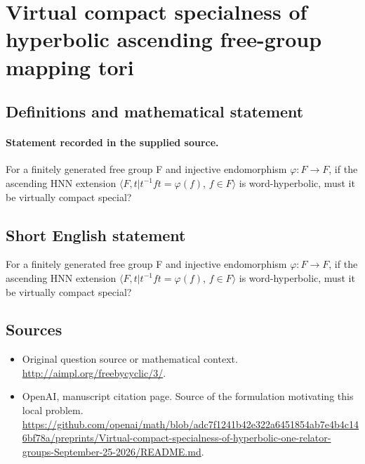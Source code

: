 \documentclass[11pt]{article}
\begin{document}
\section*{Virtual compact specialness of hyperbolic ascending free-group mapping tori}\label{30007193}
\subsection{Definitions and mathematical statement}
\paragraph{Statement recorded in the supplied source.}
For a finitely generated free group F and injective endomorphism $\varphi :F\to F$, if the ascending HNN extension $\langle F,t|t^{-1}ft=\varphi (f)$, $f\in F\rangle $ is word-hyperbolic, must it be virtually compact special?
\subsection{Short English statement}
For a finitely generated free group F and injective endomorphism $\varphi :F\to F$, if the ascending HNN extension $\langle F,t|t^{-1}ft=\varphi (f)$, $f\in F\rangle $ is word-hyperbolic, must it be virtually compact special?
\subsection{Sources}
\begin{itemize}
\item[S1] Original question source or mathematical context.
\url{http://aimpl.org/freebycyclic/3/}.
\item[S2] OpenAI, manuscript citation page. Source of the formulation motivating this local problem.
\url{https://github.com/openai/math/blob/adc7f1241b42e322a6451854ab7e4b4c146bf78a/preprints/Virtual-compact-specialness-of-hyperbolic-one-relator-groups-September-25-2026/README.md}.
\end{itemize}
\end{document}
